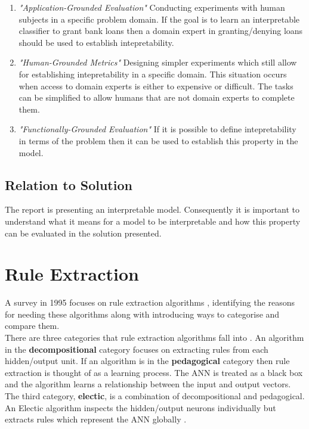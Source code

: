 \begin{enumerate}
	\item \textit{"Application-Grounded Evaluation"} Conducting experiments with human subjects in a specific problem domain. If the goal is to learn an interpretable classifier to grant bank loans then a domain expert in granting/denying loans should be used to establish intepretability.
	
	\item \textit{"Human-Grounded Metrics"} Designing simpler experiments which still allow for establishing intepretability in a specific domain. This situation occurs when access to domain experts is either to expensive or difficult. The tasks can be simplified to allow humans that are not domain experts to complete them.
	
	\item \textit{"Functionally-Grounded Evaluation"} If it is possible to define intepretability in terms of the problem then it can be used to establish this property in the model.
\end{enumerate}

\subsection{Relation to Solution}
The report is presenting an interpretable model. Consequently it is important to understand what it means for a model to be interpretable and how this property can be evaluated in the solution presented.


\section{Rule Extraction}

A survey in 1995 focuses on rule extraction algorithms \cite{andrews1995survey}, identifying the reasons for needing these algorithms along with introducing ways to categorise and compare them.\\

There are three categories that rule extraction algorithms fall into \cite{andrews1995survey}. An algorithm in the \textbf{decompositional} category focuses on extracting rules from each hidden/output unit. If an algorithm is in the \textbf{pedagogical} category then rule extraction is thought of as a learning process. The ANN is treated as a black box and the algorithm learns a relationship between the input and output vectors. The third category, \textbf{electic}, is a combination of decompositional and pedagogical. An Electic algorithm inspects the hidden/output neurons individually but extracts rules which represent the ANN globally \cite{tickle1998truth}.\\

